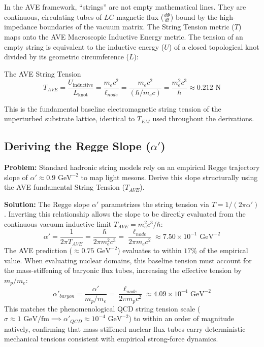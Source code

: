 In the AVE framework, ``strings'' are not empty mathematical lines. They are continuous, circulating tubes of $LC$ magnetic flux ($\frac{d\Phi}{dt}$) bound by the high-impedance boundaries of the vacuum matrix. The String Tension metric ($T$) maps onto the AVE Macroscopic Inductive Energy metric. The tension of an empty string is equivalent to the inductive energy ($U$) of a closed topological knot divided by its geometric circumference ($L$):
\begin{resultbox}{The AVE String Tension}
\begin{equation}
    T_{AVE} = \frac{U_{\text{inductive}}}{L_{\text{knot}}} = \frac{m_e c^2}{\ell_{node}} = \frac{m_e c^2}{(\hbar / m_e c)} = \frac{m_e^2 c^3}{\hbar} \approx 0.212 \text{ N}
\end{equation}
\end{resultbox}

This is the fundamental baseline electromagnetic string tension of the unperturbed substrate lattice, identical to $T_{EM}$ used throughout the derivations.

\subsection{Deriving the Regge Slope ($\alpha'$)}

\begin{examplebox}
\textbf{Problem:} Standard hadronic string models rely on an empirical Regge trajectory slope of $\alpha' \approx 0.9 \text{ GeV}^{-2}$ to map light mesons. Derive this slope structurally using the AVE fundamental String Tension ($T_{AVE}$).

\textbf{Solution:} The Regge slope $\alpha'$ parametrizes the string tension via $T = 1/(2\pi\alpha')$. Inverting this relationship allows the slope to be directly evaluated from the continuous vacuum inductive limit $T_{AVE} = m_e^2 c^3/\hbar$:
\[ \alpha' = \frac{1}{2\pi T_{AVE}} = \frac{\hbar}{2\pi m_e^2 c^3} = \frac{\ell_{node}}{2\pi m_e c^2} \approx 7.50 \times 10^{-1} \text{ GeV}^{-2} \]
The AVE prediction ($\approx 0.75 \text{ GeV}^{-2}$) evaluates to within $17\%$ of the empirical value.
When evaluating nuclear domains, this baseline tension must account for the mass-stiffening of baryonic flux tubes, increasing the effective tension by $m_p/m_e$:
\[ \alpha'_{baryon} = \frac{\alpha'}{m_p/m_e} = \frac{\ell_{node}}{2\pi m_p c^2} \approx 4.09 \times 10^{-4} \text{ GeV}^{-2} \]
This matches the phenomenological QCD string tension scale ($\sigma \approx 1 \text{ GeV/fm} \implies \alpha'_{QCD} \approx 10^{-4} \text{ GeV}^{-2}$) to within an order of magnitude natively, confirming that mass-stiffened nuclear flux tubes carry deterministic mechanical tensions consistent with empirical strong-force dynamics.
\end{examplebox}

